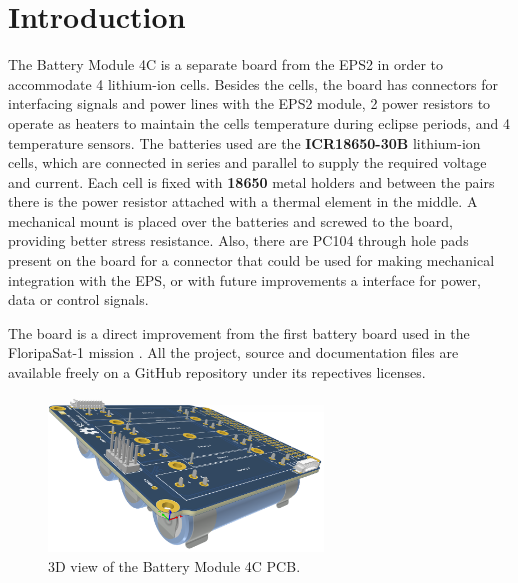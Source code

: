 %
%
%
%
%

%
%
%
%
%
%

\chapter{Introduction} \label{ch:introduction}

The {Battery Module 4C} is a separate board from the EPS2 \cite{eps2} in order to accommodate 4 lithium-ion cells. Besides the cells, the board has connectors for interfacing signals and power lines with the EPS2 module, 2 power resistors to operate as heaters to maintain the cells temperature during eclipse periods, and 4 temperature sensors. The batteries used are the \textbf{ICR18650-30B} lithium-ion cells, which are connected in series and parallel to supply the required voltage and current. Each cell is fixed with \textbf{18650} metal holders and between the pairs there is the power resistor attached with a thermal element in the middle. A mechanical mount is placed over the batteries and screwed to the board, providing better stress resistance. Also, there are PC104 through hole pads present on the board for a connector that could be used for making mechanical integration with the EPS, or with future improvements a interface for power, data or control signals.

The board is a direct improvement from the first battery board used in the FloripaSat-1 mission \cite{battery-board-1}. All the project, source and documentation files are available freely on a GitHub repository \cite{bat4c} under its repectives licenses.

\begin{figure}[!ht]
    \begin{center}
        \includegraphics[width=0.65\textwidth]{figures/bat4c-pcb-3d.png}
        \caption{3D view of the Battery Module 4C PCB.}
        \label{fig:pcb-3d}
    \end{center}
\end{figure}